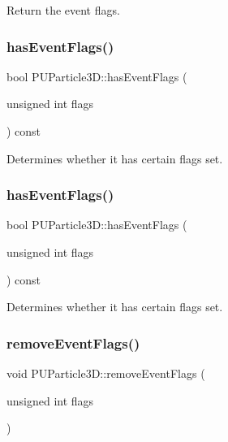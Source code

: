 Return the event flags. \mbox{\label{structPUParticle3D_ac66551a0117e3a867f58a34bb228aefb}} 
\subsubsection{\texorpdfstring{has\+Event\+Flags()}{hasEventFlags()}\hspace{0.1cm}{\footnotesize\ttfamily [1/2]}}
{\footnotesize\ttfamily bool P\+U\+Particle3\+D\+::has\+Event\+Flags (\begin{DoxyParamCaption}\item[{unsigned int}]{flags }\end{DoxyParamCaption}) const\hspace{0.3cm}{\ttfamily [inline]}}

Determines whether it has certain flags set. \mbox{\label{structPUParticle3D_ac66551a0117e3a867f58a34bb228aefb}} 
\subsubsection{\texorpdfstring{has\+Event\+Flags()}{hasEventFlags()}\hspace{0.1cm}{\footnotesize\ttfamily [2/2]}}
{\footnotesize\ttfamily bool P\+U\+Particle3\+D\+::has\+Event\+Flags (\begin{DoxyParamCaption}\item[{unsigned int}]{flags }\end{DoxyParamCaption}) const\hspace{0.3cm}{\ttfamily [inline]}}

Determines whether it has certain flags set. \mbox{\label{structPUParticle3D_a561b071d395cd92b8ea688acda6aa12a}} 
\subsubsection{\texorpdfstring{remove\+Event\+Flags()}{removeEventFlags()}\hspace{0.1cm}{\footnotesize\ttfamily [1/2]}}
{\footnotesize\ttfamily void P\+U\+Particle3\+D\+::remove\+Event\+Flags (\begin{DoxyParamCaption}\item[{unsigned int}]{flags }\end{DoxyParamCaption})\hspace{0.3cm}{\ttfamily [inline]}}

